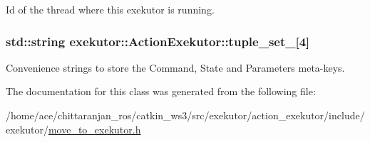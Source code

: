 \-Id of the thread where this exekutor is running. 

\hypertarget{classexekutor_1_1ActionExekutor_a22f5cde3fe83eb147ec50c2d760b2d1f}{
\subsubsection[{tuple\-\_\-set\-\_\-}]{\setlength{\rightskip}{0pt plus 5cm}std\-::string {\bf exekutor\-::\-Action\-Exekutor\-::tuple\-\_\-set\-\_\-}\mbox{[}4\mbox{]}}}\label{classexekutor_1_1ActionExekutor_a22f5cde3fe83eb147ec50c2d760b2d1f}


\-Convenience strings to store the \-Command, \-State and \-Parameters meta-\/keys. 



\-The documentation for this class was generated from the following file\-:\begin{DoxyCompactItemize}
\item 
/home/ace/chittaranjan\-\_\-ros/catkin\-\_\-ws3/src/exekutor/action\-\_\-exekutor/include/exekutor/\hyperlink{move__to__exekutor_8h}{move\-\_\-to\-\_\-exekutor.\-h}\end{DoxyCompactItemize}
